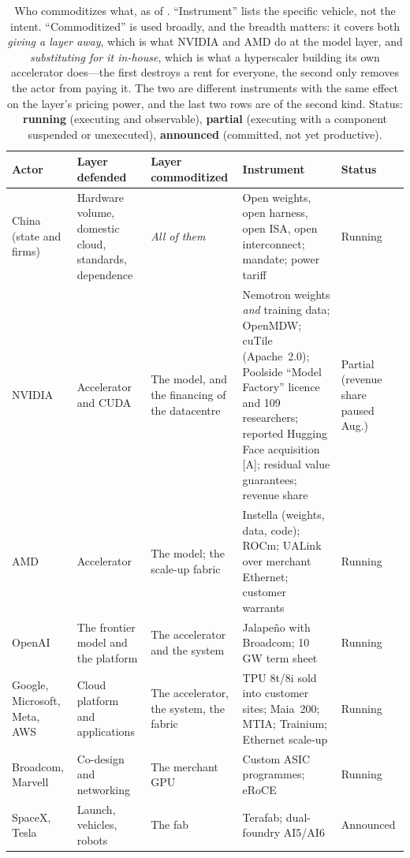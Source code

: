 \begin{table}[htbp]
\centering\footnotesize
\caption{Who commoditizes what, as of \datafreeze. ``Instrument'' lists the specific vehicle, not the intent. ``Commoditized'' is used broadly, and the breadth matters: it covers both \emph{giving a layer away}, which is what NVIDIA and AMD do at the model layer, and \emph{substituting for it in-house}, which is what a hyperscaler building its own accelerator does---the first destroys a rent for everyone, the second only removes the actor from paying it. The two are different instruments with the same effect on the layer's pricing power, and the last two rows are of the second kind. Status: \textbf{running} (executing and observable), \textbf{partial} (executing with a component suspended or unexecuted), \textbf{announced} (committed, not yet productive).}
\label{tab:mirror}
\begin{tabular}{@{}p{25mm}p{33mm}p{33mm}p{40mm}p{15mm}@{}}
\toprule
\textbf{Actor} & \textbf{Layer defended} & \textbf{Layer commoditized} & \textbf{Instrument} & \textbf{Status} \\
\midrule
China (state and firms) & Hardware volume, domestic cloud, standards, dependence & \emph{All of them} & Open weights, open harness, open ISA, open interconnect; mandate; power tariff & Running \\
NVIDIA & Accelerator and CUDA & The model, and the financing of the datacentre & Nemotron weights \emph{and} training data; OpenMDW; cuTile (Apache~2.0); Poolside ``Model Factory'' licence and 109 researchers; reported Hugging Face acquisition [A]; residual value guarantees; revenue share & Partial (revenue share paused Aug.) \\
AMD & Accelerator & The model; the scale-up fabric & Instella (weights, data, code); ROCm; UALink over merchant Ethernet; customer warrants & Running \\
OpenAI & The frontier model and the platform & The accelerator and the system & Jalape\~no with Broadcom; 10\,GW term sheet & Running \\
Google, Microsoft, Meta, AWS & Cloud platform and applications & The accelerator, the system, the fabric & TPU 8t/8i sold into customer sites; Maia~200; MTIA; Trainium; Ethernet scale-up & Running \\
Broadcom, Marvell & Co-design and networking & The merchant GPU & Custom ASIC programmes; eRoCE & Running \\
SpaceX, Tesla & Launch, vehicles, robots & The fab & Terafab; dual-foundry AI5/AI6 & Announced \\
\bottomrule
\end{tabular}
\end{table}

